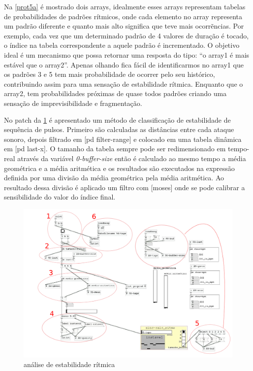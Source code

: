 \documentclass[draft]{ppgmus}
\begin{document}
Na \ref{prot5a} é mostrado dois arrays, idealmente esses arrays representam tabelas
de probabilidades de padrões rítmicos, onde cada elemento no array representa um
padrão diferente e quanto mais alto significa que teve mais ocorrẽncias.
Por exemplo, cada vez que um determinado padrão de 4 valores de duração é tocado, 
o índice na tabela correspondente a aquele padrão é incrementado. O objetivo ideal
é um mecanismo que possa retornar uma resposta do tipo:
``o array1 é mais estável que o array2''. Apenas olhando fica fácil de identificarmos
no array1 que os padrões 3 e 5 tem mais probabilidade de ocorrer pelo seu histórico,
contribuindo assim para uma sensação de estabilidade rítmica. Enquanto que o array2,
tem probabilidades próximas de quase todos padrões criando uma sensação de imprevisibilidade
e fragmentação.



No patch da \ref{[sinc-calc-ritmo]} é apresentado um método de classificação de estabilidade
de sequência de pulsos. Primeiro são calculadas as distâncias entre cada ataque
sonoro, depois filtrado em [pd filter-range] e colocado em uma tabela dinâmica em
[pd last-x]. O tamanho da tabela sempre pode ser redimensionado em tempo-real através
da variável \textit{0-buffer-size} então é calculado ao mesmo tempo a média geométrica
e a média aritmética e os resultados são executados na expressão definida por uma
divisão da média geométrica pela média aritmética. %
Ao resultado dessa divisão é aplicado um filtro com [moses] onde se pode calibrar
a sensibilidade do valor do índice final.


\begin{figure}
\includegraphics[scale=.5]{sinc-calc-ritmo}
\caption{análise de estabilidade rítmica}
\label{[sinc-calc-ritmo]}
\end{figure}
\end{document}
